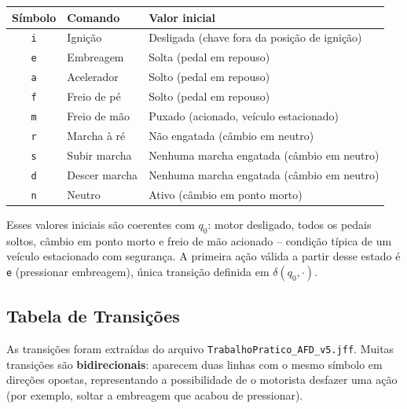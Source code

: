 \documentclass[12pt,a4paper]{article}
\begin{document}
\begin{center}
\begin{tabular}{|c|l|l|}
    \hline
    \textbf{Símbolo} & \textbf{Comando} & \textbf{Valor inicial} \\
    \hline
    \texttt{i} & Ignição       & Desligada (chave fora da posição de ignição) \\
    \texttt{e} & Embreagem     & Solta (pedal em repouso) \\
    \texttt{a} & Acelerador    & Solto (pedal em repouso) \\
    \texttt{f} & Freio de pé   & Solto (pedal em repouso) \\
    \texttt{m} & Freio de mão  & Puxado (acionado, veículo estacionado) \\
    \texttt{r} & Marcha à ré   & Não engatada (câmbio em neutro) \\
    \texttt{s} & Subir marcha  & Nenhuma marcha engatada (câmbio em neutro) \\
    \texttt{d} & Descer marcha & Nenhuma marcha engatada (câmbio em neutro) \\
    \texttt{n} & Neutro        & Ativo (câmbio em ponto morto) \\
    \hline
\end{tabular}
\end{center}

Esses valores iniciais são coerentes com $q_0$: motor desligado, todos os pedais soltos, câmbio em ponto morto e freio de mão acionado -- condição típica de um veículo estacionado com segurança. A primeira ação válida a partir desse estado é \texttt{e} (pressionar embreagem), única transição definida em $\delta(q_0, \cdot)$.

\subsection{Tabela de Transições}
As transições foram extraídas do arquivo \texttt{TrabalhoPratico\_AFD\_v5.jff}. Muitas transições são \textbf{bidirecionais}: aparecem duas linhas com o mesmo símbolo em direções opostas, representando a possibilidade de o motorista desfazer uma ação (por exemplo, soltar a embreagem que acabou de pressionar).
\end{document}
